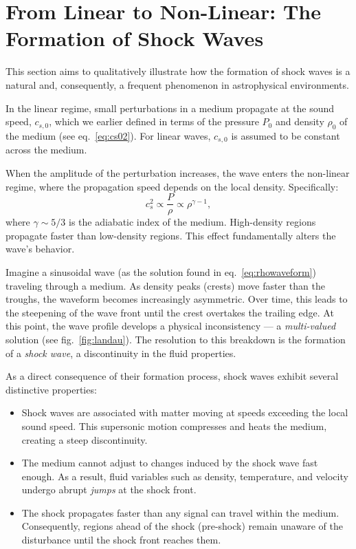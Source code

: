 \section{From Linear to Non-Linear: The Formation of Shock Waves}

This section aims to qualitatively illustrate how the formation of shock waves is a natural and, consequently, a frequent phenomenon in astrophysical environments.

In the linear regime, small perturbations in a medium propagate at the sound speed, \( c_{s,0} \), which we earlier defined in terms of the pressure \( P_0 \) and density \( \rho_0 \) of the medium (see eq.~\ref{eq:cs02}). For linear waves, \( c_{s,0} \) is assumed to be constant across the medium. 

When the amplitude of the perturbation increases, the wave enters the non-linear regime, where the propagation speed depends on the local density. Specifically:  
\[
c_s^2 \propto \frac{P}{\rho} \propto \rho^{\gamma - 1},
\]  
where \( \gamma \sim 5/3 \) is the adiabatic index of the medium. High-density regions propagate faster than low-density regions. This effect fundamentally alters the wave's behavior.  

Imagine a sinusoidal wave (as the solution found in eq.~\ref{eq:rhowaveform}) traveling through a medium. As density peaks (crests) move faster than the troughs, the waveform becomes increasingly asymmetric. Over time, this leads to the steepening of the wave front until the crest overtakes the trailing edge. At this point, the wave profile develops a physical inconsistency --- a \emph{multi-valued} solution (see fig.~\ref{fig:landau}). The resolution to this breakdown is the formation of a \emph{shock wave}, a discontinuity in the fluid properties.

As a direct consequence of their formation process, shock waves exhibit several distinctive properties:
%
\begin{itemize}
\item Shock waves are associated with matter moving at speeds exceeding the local sound speed. This supersonic motion compresses and heats the medium, creating a steep discontinuity.  
\item The medium cannot adjust to changes induced by the shock wave fast enough. As a result, fluid variables such as density, temperature, and velocity undergo abrupt \emph{jumps} at the shock front.  
\item The shock propagates faster than any signal can travel within the medium. Consequently, regions ahead of the shock (pre-shock) remain unaware of the disturbance until the shock front reaches them.  
\end{itemize}

